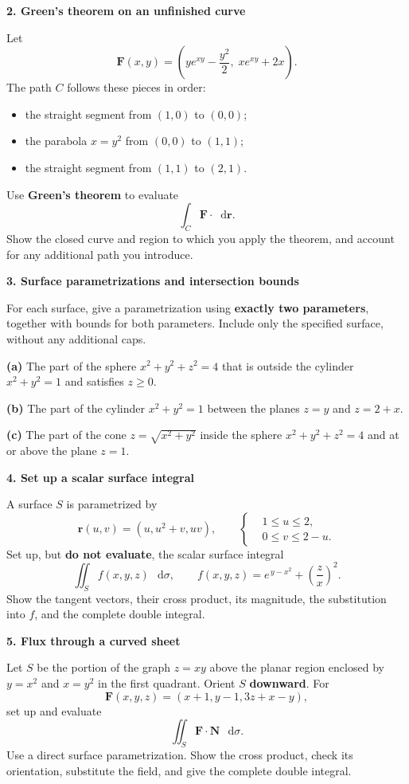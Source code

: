 \documentclass[11pt,letterpaper]{article}
\renewcommand{\vec}[1]{\mathbf{#1}}
\newcommand{\dd}{\mathop{}\!\mathrm{d}}
\newcommand{\examproblem}[3]{%
  \par\medskip\Needspace{5\baselineskip}
  \noindent\textbf{#1. #2}\par\nobreak
}
\begin{document}
\examproblem{2}{Green's theorem on an unfinished curve}{12}
Let
\[
\vec F(x,y)=\left(ye^{xy}-\frac{y^2}{2},\;xe^{xy}+2x\right).
\]
The path $C$ follows these pieces in order:
\begin{itemize}
\item the straight segment from $(1,0)$ to $(0,0)$;
\item the parabola $x=y^2$ from $(0,0)$ to $(1,1)$;
\item the straight segment from $(1,1)$ to $(2,1)$.
\end{itemize}
Use \textbf{Green's theorem} to evaluate
\[
\int_C\vec F\cdot\dd\vec r.
\]
Show the closed curve and region to which you apply the theorem, and
account for any additional path you introduce.

\examproblem{3}{Surface parametrizations and intersection bounds}{12}
For each surface, give a parametrization using \textbf{exactly two
parameters}, together with bounds for both parameters. Include only the
specified surface, without any additional caps.

\textbf{(a)} The part of the sphere $x^2+y^2+z^2=4$ that is outside the
cylinder $x^2+y^2=1$ and satisfies $z\ge0$.

\textbf{(b)} The part of the cylinder $x^2+y^2=1$ between the planes
$z=y$ and $z=2+x$.

\textbf{(c)} The part of the cone $z=\sqrt{x^2+y^2}$ inside the sphere
$x^2+y^2+z^2=4$ and at or above the plane $z=1$.

\examproblem{4}{Set up a scalar surface integral}{12}
A surface $S$ is parametrized by
\[
\vec r(u,v)=(u,u^2+v,uv),\qquad
\left\{
\begin{aligned}
&1\le u\le2,\\
&0\le v\le2-u.
\end{aligned}
\right.
\]
Set up, but \textbf{do not evaluate}, the scalar surface integral
\[
\iint_S f(x,y,z)\,\dd\sigma,
\qquad
f(x,y,z)=e^{\,y-x^2}+\left(\frac{z}{x}\right)^2.
\]
Show the tangent vectors, their cross product, its magnitude, the
substitution into $f$, and the complete double integral.

\examproblem{5}{Flux through a curved sheet}{20}
Let $S$ be the portion of the graph $z=xy$ above the planar region
enclosed by $y=x^2$ and $x=y^2$ in the first quadrant. Orient $S$
\textbf{downward}. For
\[
\vec F(x,y,z)=(x+1,y-1,3z+x-y),
\]
set up and evaluate
\[
\iint_S\vec F\cdot\vec N\,\dd\sigma.
\]
Use a direct surface parametrization. Show the cross product, check its
orientation, substitute the field, and give the complete double integral.
\end{document}
